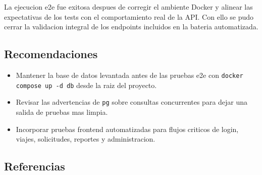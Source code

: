 \documentclass{article}
\begin{document}
La ejecucion e2e fue exitosa despues de corregir el ambiente Docker y alinear las expectativas de los tests con el comportamiento real de la API. Con ello se pudo cerrar la validacion integral de los endpoints incluidos en la bateria automatizada.

\subsection{Recomendaciones}
\begin{itemize}[leftmargin=*]
    \item Mantener la base de datos levantada antes de las pruebas e2e con \texttt{docker compose up -d db} desde la raiz del proyecto.
    \item Revisar las advertencias de \texttt{pg} sobre consultas concurrentes para dejar una salida de pruebas mas limpia.
    \item Incorporar pruebas frontend automatizadas para flujos criticos de login, viajes, solicitudes, reportes y administracion.
\end{itemize}

\subsection{Referencias}




\vfill
\end{document}
